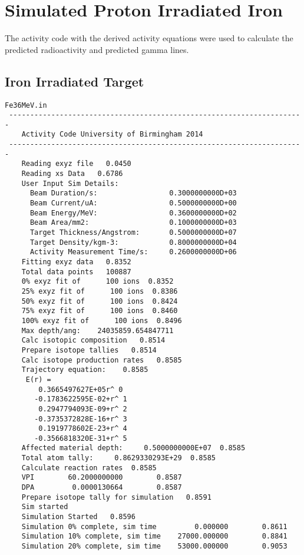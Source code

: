 \section{Simulated Proton Irradiated Iron}

The activity code with the derived activity equations were used to calculate the predicted radioactivity and predicted gamma lines.


\subsection{Iron Irradiated Target}

\begin{lstlisting}[style=sOutputFile,caption={Mailshot Extract}]
 Fe36MeV.in
 ----------------------------------------------------------------------
    Activity Code University of Birmingham 2014
 ----------------------------------------------------------------------
    Reading exyz file   0.0450
    Reading xs Data   0.6786
    User Input Sim Details:
      Beam Duration/s:                 0.3000000000D+03
      Beam Current/uA:                 0.5000000000D+00
      Beam Energy/MeV:                 0.3600000000D+02
      Beam Area/mm2:                   0.1000000000D+03
      Target Thickness/Angstrom:       0.5000000000D+07
      Target Density/kgm-3:            0.8000000000D+04
      Activity Measurement Time/s:     0.2600000000D+06
    Fitting exyz data   0.8352
    Total data points   100887
    0% exyz fit of      100 ions  0.8352
    25% exyz fit of      100 ions  0.8386
    50% exyz fit of      100 ions  0.8424
    75% exyz fit of      100 ions  0.8460
    100% exyz fit of      100 ions  0.8496
    Max depth/ang:    24035859.654847711     
    Calc isotopic composition   0.8514
    Prepare isotope tallies   0.8514
    Calc isotope production rates   0.8585
    Trajectory equation:    0.8585
     E(r) = 
        0.3665497627E+05r^ 0
       -0.1783622595E-02+r^ 1
        0.2947794093E-09+r^ 2
       -0.3735372828E-16+r^ 3
        0.1919778602E-23+r^ 4
       -0.3566818320E-31+r^ 5
    Affected material depth:     0.5000000000E+07  0.8585
    Total atom tally:     0.8629330293E+29  0.8585
    Calculate reaction rates  0.8585
    VPI        60.2000000000        0.8587
    DPA         0.0000130664        0.8587
    Prepare isotope tally for simulation   0.8591
    Sim started
    Simulation Started   0.8596
    Simulation 0% complete, sim time         0.000000        0.8611
    Simulation 10% complete, sim time    27000.000000        0.8841
    Simulation 20% complete, sim time    53000.000000        0.9053

\end{lstlisting}
